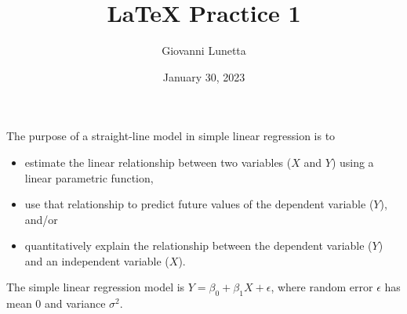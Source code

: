 \documentclass[12pt, letterpaper]{article}
\title{LaTeX Practice 1}
\author{Giovanni Lunetta}
\date{January 30, 2023}
\begin{document}
\maketitle
The purpose of a straight-line model in simple linear regression is to
\begin{itemize}
  \item estimate the linear relationship between two variables ($X$ and $Y$) using a linear parametric function,
  \item use that relationship to predict future values of the dependent variable ($Y$), and/or
  \item quantitatively explain the relationship between the dependent variable ($Y$) and an independent variable ($X$).
\end{itemize}
The simple linear regression model is $Y = \beta_0 + \beta_1X + \epsilon$, where random error $\epsilon$ has mean 0 and variance $\sigma^2$.
\end{document}
